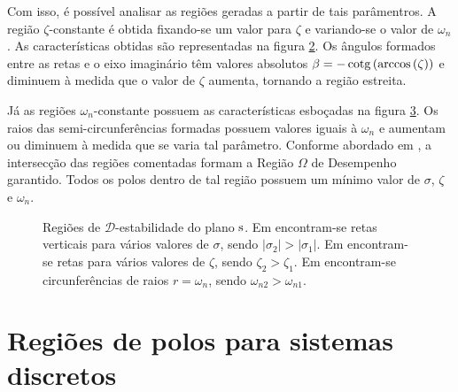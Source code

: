 Com isso, é possível analisar as regiões geradas a partir de tais parâmentros. A região $\zeta$-constante é obtida fixando-se um valor para $\zeta$ e variando-se o valor de $\omega_n$. As características obtidas são representadas na figura \ref{subfig:MaximoSobressinalS}. Os ângulos formados entre as retas e o eixo imaginário têm valores absolutos $\beta = -\operatorname{cotg}{\left(\arccos{\left(\zeta\right)}\right)}$ e diminuem à medida que o valor de $\zeta$ aumenta, tornando a região estreita.

Já as regiões $\omega_n$-constante possuem as características esboçadas na figura \ref{subfig:OscilacaoNaoAmortecidaS}. Os raios das semi-circunferências formadas possuem valores iguais à $\omega_n$ e aumentam ou diminuem à medida que se varia tal parâmetro. Conforme abordado em , a intersecção das regiões comentadas formam a Região $\Omega$ de Desempenho garantido. Todos os polos dentro de tal região possuem um mínimo valor de $\sigma$, $\zeta$ e $\omega_n$.

\begin{figure}[!hb]
  \centering
  \begin{subfigure}[t]{0.3\columnwidth}
      
      \caption{}
      \label{subfig:EstabilidadeRelativaS}
  \end{subfigure}
  \begin{subfigure}[t]{0.3\columnwidth}
      
      \caption{}
      \label{subfig:MaximoSobressinalS}
  \end{subfigure}
  \begin{subfigure}[t]{0.35\columnwidth}
    
    \caption{}
    \label{subfig:OscilacaoNaoAmortecidaS}
  \end{subfigure}
  \caption{Regiões de $\mathscr{D}$-estabilidade do plano $\operatorname{\mathrm{s}}$. Em  encontram-se retas verticais para vários valores de $\sigma$, sendo $|\sigma_2| > |\sigma_1|$. Em  encontram-se retas para vários valores de $\zeta$, sendo $\zeta_2 > \zeta_1$. Em  encontram-se circunferências de raios $r = \omega_n$, sendo $\omega_{n2} > \omega_{n1}$.}
  \label{fig:RegioesPlanoS}
\end{figure}

\section{Regiões de polos para sistemas discretos}\label{sec:DEstabilidadeZ}

